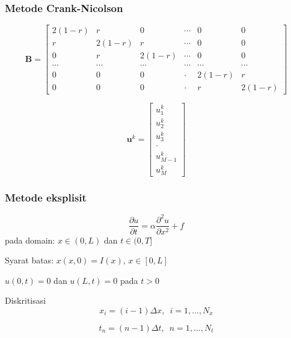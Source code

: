 \documentclass[9pt]{beamer}
\begin{document}
\begin{frame}
\frametitle{Metode Crank-Nicolson}

$$
\mathbf{B} =
\begin{bmatrix}
2(1 - r) & r & 0 & \cdots & 0 & 0 \\
r & 2(1 - r) & r & \cdots & 0 & 0 \\
0 & r & 2(1 - r) & \cdots & 0 & 0 \\
\cdots & \cdots & \cdots & \cdots & \cdots & \cdots \\
0 & 0 & 0 & \cdot & 2(1 - r) & r \\
0 & 0 & 0 & \cdot & r & 2(1 - r)
\end{bmatrix}
$$

$$
\mathbf{u}^{k} =
\begin{bmatrix}
u^{k}_{1} \\
u^{k}_{2} \\
u^{k}_{3} \\
\cdot \\
u^{k}_{M-1} \\
u^{k}_{M}
\end{bmatrix}
$$


\end{frame}


\begin{frame}
\frametitle{Metode eksplisit}

\begin{equation}
\frac{\partial u}{\partial t} = \alpha \frac{\partial^2 u}{\partial x^2} + f
\end{equation}
%
pada domain: $x \in (0,L)$ dan $t \in (0,T]$

Syarat batas: $x(x,0) = I(x)$, $x \in [0,L]$

$u(0,t) = 0$ dan $u(L,t) = 0$ pada $t > 0$

Diskritisasi
\begin{equation}
x_{i} = (i-1)\Delta x,\,\,\, i = 1,\ldots,N_{x}
\end{equation}

\begin{equation}
t_{n} = (n-1)\Delta t,\,\,\, n= 1,\ldots,N_{t}
\end{equation}

\end{frame}
\end{document}
